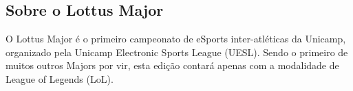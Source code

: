 \subsection{Sobre o Lottus Major}

O Lottus Major é o primeiro campeonato de eSports inter-atléticas da Unicamp, organizado pela Unicamp Electronic Sports League (UESL). Sendo o primeiro de muitos outros Majors por vir, esta edição contará apenas com a modalidade de League of Legends (LoL).
